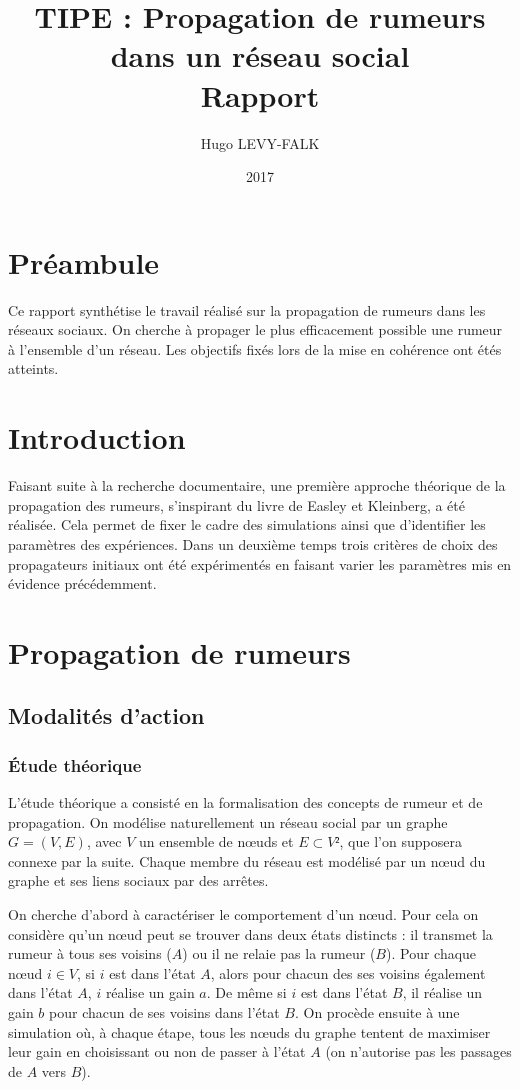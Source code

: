 \documentclass{article}
\title{TIPE : Propagation de rumeurs dans un réseau social\\Rapport}
\author{Hugo LEVY-FALK}
\date{2017}
\begin{document}
\maketitle
{}\;
\tableofcontents
\newpage

\section{Préambule}
Ce rapport synthétise le travail réalisé sur la propagation de rumeurs dans les réseaux sociaux. On cherche à propager le plus efficacement possible une rumeur à l'ensemble d'un réseau. Les objectifs fixés lors de la mise en cohérence ont étés atteints.

\section{Introduction}
Faisant suite à la recherche documentaire, une première approche théorique de la propagation des rumeurs, s'inspirant du livre de Easley et Kleinberg, a été réalisée. Cela permet de fixer le cadre des simulations ainsi que d'identifier les paramètres des expériences. Dans un deuxième temps trois critères de choix des propagateurs initiaux ont été expérimentés en faisant varier les paramètres mis en évidence précédemment.

\section{Propagation de rumeurs}
\subsection{Modalités d'action}
\subsubsection{Étude théorique}
L'étude théorique a consisté en la formalisation des concepts de rumeur et de propagation. On modélise naturellement un réseau social par un graphe $G = (V,E)$, avec $V$ un ensemble de nœuds et $E\subset V²$, que l'on supposera connexe par la suite. Chaque membre du réseau est modélisé par un nœud du graphe et ses liens sociaux par des arrêtes.

On cherche d'abord à caractériser le comportement d'un nœud. Pour cela on considère qu'un nœud peut se trouver dans deux états distincts : il transmet la rumeur à tous ses voisins ($A$) ou il ne relaie pas la rumeur ($B$). Pour chaque nœud $i\in V$, si $i$ est dans l'état $A$, alors pour chacun des ses voisins également dans l'état $A$, $i$ réalise un gain $a$. De même si $i$ est dans l'état $B$, il réalise un gain $b$ pour chacun de ses voisins dans l'état $B$. On procède ensuite à une simulation où, à chaque étape, tous les nœuds du graphe tentent de maximiser leur gain en choisissant ou non de passer à l'état $A$ (on n'autorise pas les passages de $A$ vers $B$).
\end{document}
